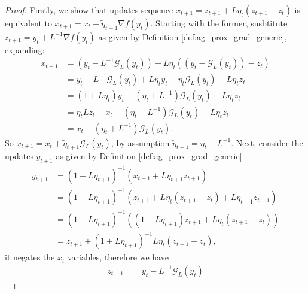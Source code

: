 \documentclass[12pt]{article}
\begin{document}
        \begin{proof}
            Firstly, we show that updates sequence $x_{t + 1} = z_{t + 1} + L\eta_t (z_{t + 1} - z_t)$ is equivalent to $x_{t + 1} = x_t + \tilde\eta_{t + 1}\nabla f(y_t)$. 
            Starting with the former, susbtitute $z_{t + 1} = y_t + L^{-1}\nabla f(y_t)$ as given by 
            \hyperref[def:ag_prox_grad_generic]{Definition \ref*{def:ag_prox_grad_generic}},
            expanding: 
            \begin{align*}
                x_{t + 1} &= 
                (y_t - L^{-1}\mathcal G_L(y_t)) 
                + L\eta_t ((y_t - \mathcal G_L(y_t)) - z_t)
                \\
                &= y_t - L^{-1}\mathcal G_L(y_t) 
                + L \eta_t y_t - \eta_t \mathcal G_L(y_t) - L\eta_t z_t
                \\
                &= 
                (1 + L\eta_t)y_t - (\eta_t + L^{-1})\mathcal G_L(y_t) - L\eta_t z_t
                \\
                &= \eta_t Lz_t + x_t -(\eta_t + L^{-1}) \mathcal G_L(y_t)  - L\eta_t z_t
                \\
                &= x_t - (\eta_t + L^{-1})\mathcal G_L(y_t). 
            \end{align*}
            So $x_{t + 1} = x_t + \tilde \eta_{t + 1}\mathcal G_L(y_t)$, by assumption $\tilde \eta_{t + 1} = \eta_t + L^{-1}$. 
            Next, consider the updates $y_{t + 1}$ as given by 
            \hyperref[def:ag_prox_grad_generic]{Definition \ref*{def:ag_prox_grad_generic}}
            \begin{align*}
                y_{t + 1} &= (1 + L\eta_{t + 1})^{-1} (x_{t + 1} + L\eta_{t + 1}z_{t + 1})
                \\
                &= (1 + L\eta_{t + 1})^{-1} (
                    z_{t + 1} + L\eta_t (z_{t + 1} - z_t) + L\eta_{t + 1} z_{t + 1}
                )
                \\
                &= 
                (1 + L\eta_{t + 1})^{-1} (
                    (1 + L\eta_{t + 1})z_{t + 1} + L\eta_t(z_{t + 1} - z_t)
                )
                \\
                &= z_{t + 1} + (1 + L\eta_{t + 1})^{-1}L\eta_t (z_{t + 1} - z_t), 
            \end{align*}
            it negates the $x_t$ variables, therefore we have 
            \begin{align*}
                z_{t + 1} &= y_t - L^{-1} \mathcal G_L (y_t)

\end{align*}
\end{proof}
\end{document}
